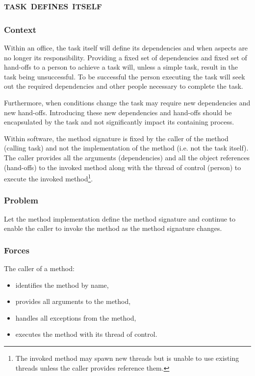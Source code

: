 \documentclass[prodmode]{style/acmlarge}
\begin{document}
\subsection{\textsc{\textbf{task defines itself}}}

\subsubsection*{Context} Within an office, the task itself will define its
dependencies and when aspects are no longer its responsibility.  Providing a
fixed set of dependencies and fixed set of hand-offs to a person to achieve a
task will, unless a simple task, result in the task being unsuccessful.  To
be successful the person executing the task will seek out the required
dependencies and other people necessary to complete the task.

Furthermore, when conditions change the task may require new dependencies and
new hand-offs.  Introducing these new dependencies and hand-offs should be
encapsulated by the task and not significantly impact its containing process.

Within software, the method signature is fixed by the caller of the method
(calling task) and not the implementation of the method (i.e. not the task
itself).  The caller provides all the arguments (dependencies) and all the
object references (hand-offs) to the invoked method along with the thread of
control (person) to execute the invoked method\footnote{The invoked method may
spawn new threads but is unable to use existing threads unless the caller
provides reference them.}.

\subsubsection*{\textbf{Problem}} Let the method implementation define the method
signature and continue to enable the caller to invoke the method as the method
signature changes.

\subsubsection*{Forces} The caller of a method:
\begin{itemize}
  \item identifies the method by name,
  \item provides all arguments to the method,
  \item handles all exceptions from the method,
  \item executes the method with its thread of control.
\end{itemize}
\end{document}
